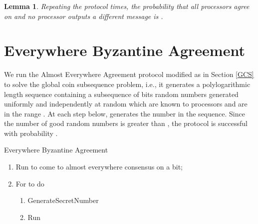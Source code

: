 \documentclass[letterpaper,11pt]{article}
\newtheorem{lemma}{Lemma}
\begin{document}
\begin{lemma}
Repeating the protocol  times,  the probability that all processors agree on  and no processor outputs a different message is . 

\end{lemma}



\section{Everywhere Byzantine Agreement}
We run the Almost Everywhere Agreement  protocol modified as in Section \ref{GCS}  to solve the global coin subsequence problem, i.e., it generates a polylogarithmic length sequence containing a subsequence of   bits  random numbers  generated uniformly and independently at random which are
known to  processors and are in the range .
At each step below,  generates the  number in the sequence.  Since the number of  good
random numbers is greater than , the protocol is successful with probability . 

\begin{algorithm}
\caption{Everywhere Byzantine Agreement}

\begin{enumerate}
\item
Run   to come to almost everywhere consensus on a bit;
\item
For  to   do
\begin{enumerate}
\item
 GenerateSecretNumber
\item
Run 
\end{enumerate}
\end{enumerate}
\end{algorithm}
\end{document}

